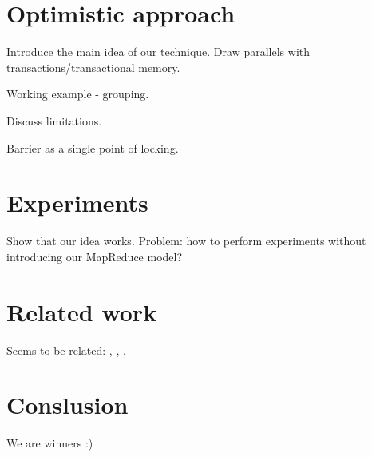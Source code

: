 \documentclass[10pt,conference,letterpaper]{IEEEtran}
\begin{document}
\section{Optimistic approach}
Introduce the main idea of our technique. Draw parallels with transactions/transactional memory. 

Working example - grouping. 

Discuss limitations.

Barrier as a single point of locking. 

\section{Experiments}
Show that our idea works. Problem: how to perform experiments without introducing our MapReduce model?

\section{Related work}
Seems to be related: \cite{4279071}, \cite{Wei:2009:SSO:1559845.1559973}, \cite{Mutschler:2014:ASP:2659232.2633686}.

\section{Conslusion}
We are winners :)



\end{document}
